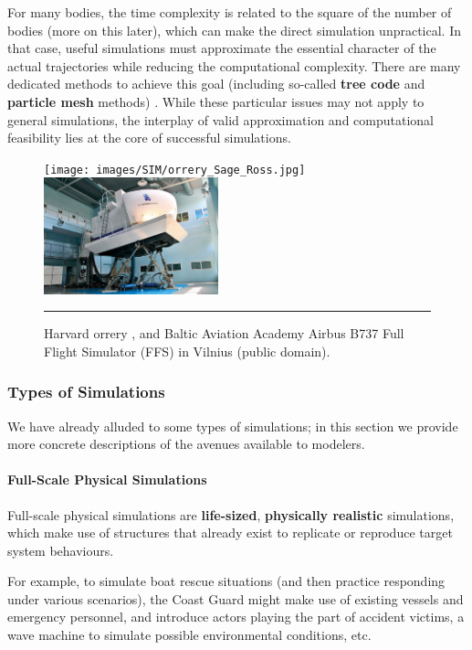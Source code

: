 For many bodies, the time complexity is related to the square of the number of bodies (more on this later), which can make the direct simulation unpractical. In that case, useful simulations must approximate the essential character of the actual trajectories  while reducing the computational complexity. There are many dedicated methods to achieve this goal (including so-called \textbf{tree code} and \textbf{particle mesh} methods) \cite{SIM_NBP}. \newpage\noindent While these particular issues may not apply to general simulations, the interplay of valid approximation and computational feasibility lies at the core of successful simulations.  
\begin{figure}[!t]
\centering
\texttt{[image: images/SIM/orrery\_Sage\_Ross.jpg]} \qquad \includegraphics[width=0.45\textwidth]{images/SIM/Baltic_Aviation_Academy_Airbus_B737_Full_Flight_Simulator_(FFS).jpg}
\caption[\small Harvard orrery; flight simulator]{\small Harvard orrery \cite{SIM_O}, and Baltic Aviation Academy Airbus B737 Full Flight Simulator (FFS) in Vilnius (public domain).}\label{fig:orr}\hrule
\end{figure}
\subsubsection{Types of Simulations}
We have already alluded to some types of simulations; in this section we provide more concrete descriptions of the avenues available to modelers. 
\paragraph{Full-Scale Physical Simulations}
Full-scale physical simulations are \textbf{life-sized}, \textbf{physically realistic} simulations, which  make use of structures that already exist to replicate or reproduce target system behaviours. \par For example, to simulate boat rescue situations (and then practice responding under various scenarios), the Coast Guard might make use of existing vessels and emergency personnel, and introduce actors playing the part of accident victims, a wave machine to simulate possible environmental conditions, etc. 

